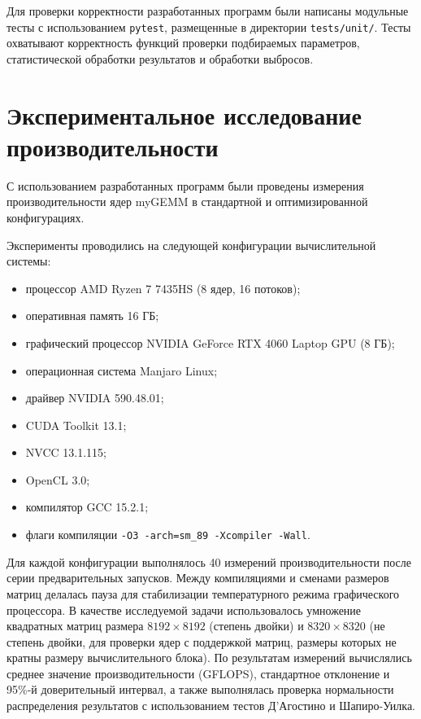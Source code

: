 \documentclass[a4paper]{article}
\begin{document}
Для проверки корректности разработанных программ были написаны модульные тесты с использованием \texttt{pytest}, размещенные в директории \texttt{tests/unit/}. Тесты охватывают корректность функций проверки подбираемых параметров, статистической обработки результатов и обработки выбросов.

\section{Экспериментальное исследование производительности}

С использованием разработанных программ были проведены измерения производительности ядер myGEMM в стандартной и оптимизированной конфигурациях.

Эксперименты проводились на следующей конфигурации вычислительной системы:
\begin{itemize}
\item процессор AMD Ryzen 7 7435HS (8 ядер, 16 потоков);
\item оперативная память 16 ГБ;
\item графический процессор NVIDIA GeForce RTX 4060 Laptop GPU (8 ГБ);
\item операционная система Manjaro Linux;
\item драйвер NVIDIA 590.48.01;
\item CUDA Toolkit 13.1;
\item NVCC 13.1.115;
\item OpenCL 3.0;
\item компилятор GCC 15.2.1;
\item флаги компиляции \texttt{-O3 -arch=sm\_89 -Xcompiler -Wall}.
\end{itemize}

Для каждой конфигурации выполнялось 40 измерений производительности после серии предварительных запусков. Между компиляциями и сменами размеров матриц делалась пауза для стабилизации температурного режима графического процессора. В качестве исследуемой задачи использовалось умножение квадратных матриц размера \(8192 \times 8192\) (степень двойки) и \(8320 \times 8320\) (не степень двойки, для проверки ядер с поддержкой матриц, размеры которых не кратны размеру вычислительного блока). По результатам измерений вычислялись среднее значение производительности (GFLOPS), стандартное отклонение и 95\%-й доверительный интервал, а также выполнялась проверка нормальности распределения результатов с использованием тестов Д'Агостино и Шапиро-Уилка.
\end{document}
